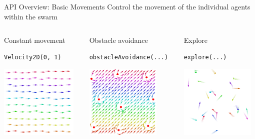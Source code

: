\documentclass[presentation, 9pt]{beamer}\mode<presentation>{\usetheme{AMSBolognaFC}}
\begin{document}
\begin{frame}[fragile]{API Overview: Basic Movements}
\centering
Control the movement of the individual agents within the swarm
\begin{columns}
	\begin{column}[t]{0.3\textwidth}
		\begin{exampleblock}{Constant movement}
		\begin{verbatim}
Velocity2D(0, 1)
		\end{verbatim}
		\includegraphics[height=3.5cm]{img/constant-movement.png}
		\end{exampleblock}
	\end{column}
	\begin{column}[t]{0.3\textwidth}
		\begin{exampleblock}{Obstacle avoidance}
		\begin{verbatim}
obstacleAvoidance(...)
		\end{verbatim}
		\centering
		\includegraphics[height=3.5cm]{img/obstracle.png}
		
		\end{exampleblock}
	\end{column}
	\begin{column}[t]{0.3\textwidth}
		\begin{exampleblock}{Explore}
		\begin{verbatim}
explore(...)
		\end{verbatim}
		\includegraphics[height=3.5cm]{img/explore-2.png}
		\end{exampleblock}
	\end{column}
\end{columns}
\end{frame}
\end{document}
